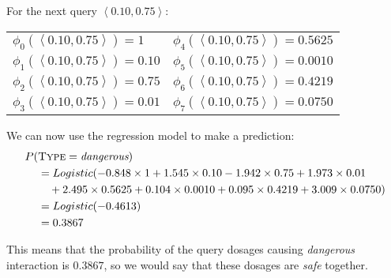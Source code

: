 \documentclass[--SOLUTION-OPTION--]{ditpaper}
\begin{document}
\begin{enumerate}
\begin{answer}
For the next query $\left<0.10	,0.75\right>$:
			\begin{center}
\begin{tabular}[ht]{ l  l  }
$\phi_0(\left<0.10, 0.75\right>) =  1$ & $\phi_4(\left<0.10, 0.75\right>) = 0.5625$ \\
$\phi_1(\left<0.10, 0.75\right>) = 0.10$ & $\phi_5(\left<0.10, 0.75\right>) = 0.0010$ \\
$\phi_2(\left<0.10, 0.75\right>) = 0.75$ &$\phi_6(\left<0.10, 0.75\right>) = 0.4219$  \\
$\phi_3(\left<0.10, 0.75\right>) = 0.01$ & $\phi_7(\left<0.10, 0.75\right>) = 0.0750$ \\
\end{tabular}
\end{center}
	We can now use the regression model to make a prediction:
		\begin{alignat*}{2}				
P(&\textsc{Type}=\textit{dangerous}) \\
&= Logistic(-0.848\times 1 + 1.545 \times 0.10  -1.942 \times0.75 + 1.973 \times 0.01 \\
& ~~~   +  2.495   \times 0.5625 + 0.104 \times 0.0010 + 0.095 \times 0.4219 + 3.009\times 0.0750) \\
& =  Logistic(-0.4613)  \\
& = 0.3867 
\end{alignat*}
 
\noindent This means that the probability of the query dosages causing \textit{dangerous} interaction is $0.3867$, so we would say that these dosages are \textit{safe} together. 

% 


\end{answer}
\end{enumerate}
\end{document}
